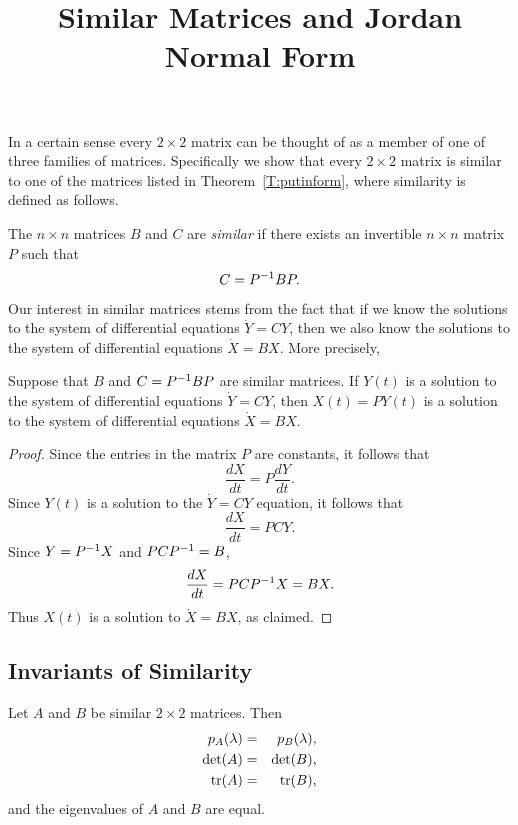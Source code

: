 \documentclass{ximera}
\title{Similar Matrices and Jordan Normal Form}
\begin{document}
\begin{abstract}
\end{abstract}
\maketitle

 \label{S:6.5}

In a certain sense every $2\times 2$ matrix can be thought of as a member 
of one of three families of matrices.  Specifically we show that every 
$2\times 2$ matrix is similar to one of the matrices listed in Theorem~\ref{T:putinform}, 
where similarity is defined as follows.

\begin{definition}  \label{D:similar}
The $n\times n$ matrices $B$ and $C$ are {\em similar\/} if
there exists an invertible $n\times n$ matrix $P$ such that
\[
C = P^{-1} BP.
\]
\end{definition}  

Our interest in similar matrices stems from the fact that if we
know the solutions to the system of differential equations $\dot{Y}=CY$, 
then we also know the solutions to the system of differential equations 
$\dot{X}=BX$.  More precisely,
\begin{lemma}  \label{L:simsoln}
Suppose that $B$ and $C=P^{-1} BP$ are similar matrices.  If
$Y(t)$ is a solution to the system of differential equations
$\dot{Y}=CY$, then $X(t)=PY(t)$ is a solution to the system of 
differential equations $\dot{X}=BX$.
\end{lemma}

\begin{proof}   
Since the entries in the matrix $P$ are constants, it follows that
\[
\frac{dX}{dt} = P\frac{dY}{dt}.
\]
Since $Y(t)$ is a solution to the $\dot{Y}=CY$ equation, it follows that
\[
\frac{dX}{dt} = PCY.
\]
Since $Y=P^{-1} X$ and $PCP^{-1} = B$,
\[
\frac{dX}{dt} = PCP^{-1} X = BX.
\]
Thus $X(t)$ is a solution to $\dot{X}=BX$, as claimed.  
\end{proof}


\subsection*{Invariants of Similarity}

\begin{lemma}  \label{L:simdettr}
Let $A$ and $B$ be similar $2\times 2$ matrices.  Then
\begin{eqnarray*}
p_A(\lambda) & = & p_B(\lambda),\\
\det(A) & = & \det(B),\\
{\rm tr}(A) & = & {\rm tr}(B),
\end{eqnarray*} 
and the eigenvalues of $A$ and $B$ are equal.
\end{lemma}
\end{document}
